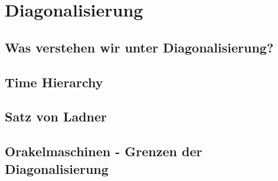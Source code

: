 
\section{Diagonalisierung}
\subsection[Diagonalisierung]{Was verstehen wir unter Diagonalisierung?}

\subsection[Time Hierarchy]{Time Hierarchy}

\subsection[Satz von Ladner]{Satz von Ladner}

\subsection[Orakelmaschinen]{Orakelmaschinen - Grenzen der Diagonalisierung}
